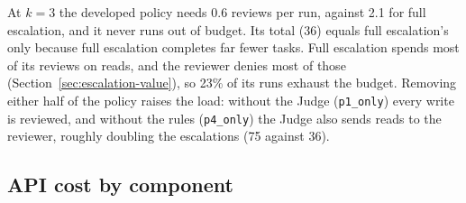 \documentclass[11pt,a4paper]{article}
\begin{document}
At $k = 3$ the developed policy needs 0.6 reviews per run, against 2.1 for
full escalation, and it never runs out of budget. Its total (36) equals full
escalation's only because full escalation completes far fewer tasks. Full
escalation spends most of its reviews on reads, and the reviewer denies most
of those (Section~\ref{sec:escalation-value}), so 23\% of its runs exhaust the
budget. Removing either half of the policy raises the load: without the Judge
(\texttt{p1\_only}) every write is reviewed, and without the rules
(\texttt{p4\_only}) the Judge also sends reads to the reviewer, roughly
doubling the escalations (75 against 36).

\subsection{API cost by component}

\begin{table}[h]
  \centering
  \small
  \caption{API cost at $k = 3$ by component (\texttt{cost.csv}), for 60 runs:
    USD, with input / output tokens in thousands.}
  \label{tab:cost}
\end{table}
\end{document}
